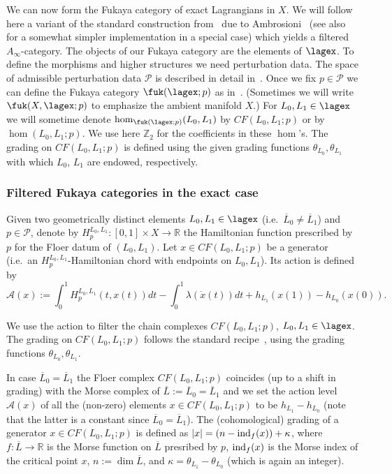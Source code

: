 We can now form the Fukaya category of exact Lagrangians in $X$. We
will follow here a variant of the standard construction
from~\cite{Se:book-fukaya-categ} due to Ambrosioni~\cite{Amb:fil-fuk}
(see also~\cite{BCZ:tpc} for a somewhat simpler implementation in a special case) which
yields a filtered $A_{\infty}$-category. The objects of our Fukaya
category are the elements of $\lagex$. To define the morphisms and
higher structures we need perturbation data. The space of admissible
perturbation data $\mathcal{P}$ is described in detail
in~\cite{Amb:fil-fuk}. Once we fix $p \in \mathcal{P}$ we can define
the Fukaya category $\fuk(\lagex; p)$ as
in~\cite{Amb:fil-fuk}. (Sometimes we will write $\fuk(X, \lagex; p)$
to emphasize the ambient manifold $X$.) For $L_0, L_1 \in \lagex$ we
will sometime denote $\hom_{\fuk(\lagex;p)}(L_0,L_1)$ by
$CF(L_0, L_1; p)$ or  by $\hom(L_0,L_1; p)$. We use here
$\mathbb{Z}_2$ for the coefficients in these $\hom$'s. The grading on
$CF(L_0, L_1; p)$ is defined using the given grading functions
$\theta_{L_0}, \theta_{L_1}$ with which $L_0$, $L_1$ are endowed,
respectively.

\subsubsection{Filtered Fukaya categories in the exact
  case} \label{sbsb:fil-ex} Given two geometrically distinct elements
$L_0, L_1 \in \lagex$ (i.e.~$\overline{L}_0 \neq \overline{L}_1$) and
$p \in \mathcal{P}$, denote by
$H^{L_0,L_1}_p: [0,1] \times X \longrightarrow \mathbb{R}$ the
Hamiltonian function prescribed by $p$ for the Floer datum of
$(L_0, L_1)$. Let $x \in CF(L_0, L_1; p)$ be a generator (i.e.~an
$H^{L_0,L_1}_p$-Hamiltonian chord with endpoints on $L_0, L_1$). Its
action is defined by
\begin{equation} \label{symp-act-1} \mathcal A(x) := \int_0^1
  H_p^{L_0,L_1}(t, x(t))dt - \int_0^1 \lambda(\dot{x}(t)) dt +
  h_{L_1}(x(1)) - h_{L_0}(x(0)).
\end{equation}

We use the action to filter the chain complexes $CF(L_0, L_1; p)$,
$L_0, L_1 \in \lagex$. The grading on $CF(L_0, L_1;p)$ follows the
standard recipe~\cite{Se:graded}, using the grading functions
$\theta_{L_0}, \theta_{L_1}$.

In case $\overline{L}_0 = \overline{L}_1$ the Floer complex
$CF(L_0, L_1; p)$ coincides (up to a shift in grading) with the Morse
complex of $\overline{L}:= \overline{L}_0 = \overline{L}_1$ and we set
the action level $\mathcal{A}(x)$ of all the (non-zero) elements
$x \in CF(L_0, L_1; p)$ to be $h_{L_1} - h_{L_0}$ (note that the
latter is a constant since $\overline{L}_0 = \overline{L}_1$). The
(cohomological) grading of a generator $x \in CF(L_0, L_1; p)$ is
defined as $|x| = (n- \textnormal{ind}_f(x)) + \kappa$, where
$f: \overline{L} \longrightarrow \mathbb{R}$ is the Morse function on
$\overline{L}$ presribed by $p$, $\textnormal{ind}_f(x)$ is the Morse
index of the critical point $x$, $n := \dim \overline{L}$, and
$\kappa = \theta_{L_1} - \theta_{L_0}$ (which is again an integer).

